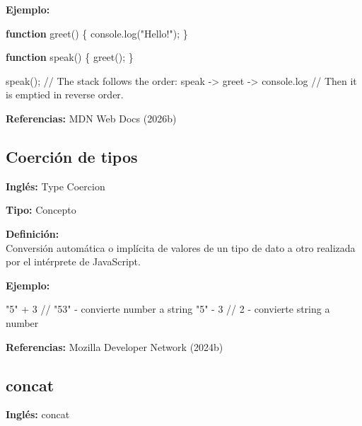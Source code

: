 \documentclass[
  letterpaper,
  DIV=11,
  numbers=noendperiod]{scrreprt}
\newenvironment{Shaded}{\begin{snugshade}}{\end{snugshade}}
\newcommand{\BuiltInTok}[1]{\textcolor[rgb]{0.00,0.23,0.31}{#1}}
\newcommand{\CommentTok}[1]{\textcolor[rgb]{0.37,0.37,0.37}{#1}}
\newcommand{\DecValTok}[1]{\textcolor[rgb]{0.68,0.00,0.00}{#1}}
\newcommand{\FunctionTok}[1]{\textcolor[rgb]{0.28,0.35,0.67}{#1}}
\newcommand{\KeywordTok}[1]{\textcolor[rgb]{0.00,0.23,0.31}{\textbf{#1}}}
\newcommand{\NormalTok}[1]{\textcolor[rgb]{0.00,0.23,0.31}{#1}}
\newcommand{\OperatorTok}[1]{\textcolor[rgb]{0.37,0.37,0.37}{#1}}
\newcommand{\StringTok}[1]{\textcolor[rgb]{0.13,0.47,0.30}{#1}}
\let\oldsubsection\subsection
\renewcommand{\subsection}{\phantomsection\oldsubsection}
\begin{document}
\textbf{Ejemplo:}

\begin{Shaded}
\begin{Highlighting}[]
\KeywordTok{function} \FunctionTok{greet}\NormalTok{() \{}
  \BuiltInTok{console}\OperatorTok{.}\FunctionTok{log}\NormalTok{(}\StringTok{"Hello!"}\NormalTok{)}\OperatorTok{;}
\NormalTok{\}}

\KeywordTok{function} \FunctionTok{speak}\NormalTok{() \{}
  \FunctionTok{greet}\NormalTok{()}\OperatorTok{;}
\NormalTok{\}}

\FunctionTok{speak}\NormalTok{()}\OperatorTok{;} 
\CommentTok{// The stack follows the order: speak {-}\textgreater{} greet {-}\textgreater{} console.log}
\CommentTok{// Then it is emptied in reverse order.}
\end{Highlighting}
\end{Shaded}

\textbf{Referencias:} MDN Web Docs (2026b)

\subsection*{Coerción de tipos}\label{glos-coercion}

\textbf{Inglés:} Type Coercion

\textbf{Tipo:} Concepto

\textbf{Definición:}\\
Conversión automática o implícita de valores de un tipo de dato a otro
realizada por el intérprete de JavaScript.

\textbf{Ejemplo:}

\begin{Shaded}
\begin{Highlighting}[]
\StringTok{"5"} \OperatorTok{+} \DecValTok{3}   \CommentTok{// "53" {-} convierte number a string}
\StringTok{"5"} \OperatorTok{{-}} \DecValTok{3}   \CommentTok{// 2 {-} convierte string a number}
\end{Highlighting}
\end{Shaded}

\textbf{Referencias:} Mozilla Developer Network (2024b)

\subsection*{concat}\label{glos-concat}

\textbf{Inglés:} concat
\end{document}
